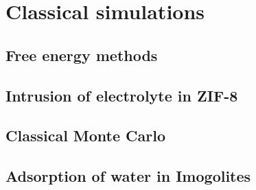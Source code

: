 \documentclass[thesis]{subfiles}
\begin{document}
\chapter{Classical simulations}
\startcontents[chapters]
\printpartialtoc

\section{Free energy methods}

\section{Intrusion of electrolyte in ZIF-8}

\section{Classical Monte Carlo}

\section{Adsorption of water in Imogolites}
\end{document}
